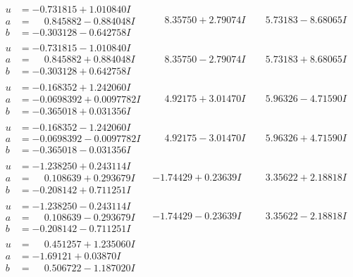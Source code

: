 \documentclass[1p]{elsarticle_modified}
\theoremstyle{definition}
\begin{document}
$$\begin{array}{c|c|c}
\begin{aligned}
u &= -0.731815 + 1.010840 I \\
a &= \phantom{-}0.845882 - 0.884048 I \\
b &= -0.303128 - 0.642758 I\end{aligned}
 & \phantom{-}8.35750 + 2.79074 I & \phantom{-}5.73183 - 8.68065 I \\ \hline\begin{aligned}
u &= -0.731815 - 1.010840 I \\
a &= \phantom{-}0.845882 + 0.884048 I \\
b &= -0.303128 + 0.642758 I\end{aligned}
 & \phantom{-}8.35750 - 2.79074 I & \phantom{-}5.73183 + 8.68065 I \\ \hline\begin{aligned}
u &= -0.168352 + 1.242060 I \\
a &= -0.0698392 + 0.0097782 I \\
b &= -0.365018 + 0.031356 I\end{aligned}
 & \phantom{-}4.92175 + 3.01470 I & \phantom{-}5.96326 - 4.71590 I \\ \hline\begin{aligned}
u &= -0.168352 - 1.242060 I \\
a &= -0.0698392 - 0.0097782 I \\
b &= -0.365018 - 0.031356 I\end{aligned}
 & \phantom{-}4.92175 - 3.01470 I & \phantom{-}5.96326 + 4.71590 I \\ \hline\begin{aligned}
u &= -1.238250 + 0.243114 I \\
a &= \phantom{-}0.108639 + 0.293679 I \\
b &= -0.208142 + 0.711251 I\end{aligned}
 & -1.74429 + 0.23639 I & \phantom{-}3.35622 + 2.18818 I \\ \hline\begin{aligned}
u &= -1.238250 - 0.243114 I \\
a &= \phantom{-}0.108639 - 0.293679 I \\
b &= -0.208142 - 0.711251 I\end{aligned}
 & -1.74429 - 0.23639 I & \phantom{-}3.35622 - 2.18818 I \\ \hline\begin{aligned}
u &= \phantom{-}0.451257 + 1.235060 I \\
a &= -1.69121 + 0.03870 I \\
b &= \phantom{-}0.506722 - 1.187020 I\end{aligned}

\end{array}$$
\end{document}

